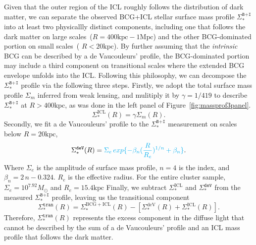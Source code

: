 \documentclass[fleqn,usenatbib]{mnras}
\newcommand{\sigbi}{\Sigma_*^{\texttt{B+I}}}
\newcommand{\sigm}{\Sigma_m}
\newcommand{\sigdev}{\Sigma_*^{\texttt{deV}}}
\newcommand{\sigtr}{\Sigma_*^{\texttt{tran}}}
\newcommand{\mpc}{\mathrm{Mpc}}
\newcommand{\kpc}{\mathrm{kpc}}
\newcommand{\msol}{M_{\odot}}
\newcommand\xkchen[1]{{\color{cyan} {#1}}}
\begin{document}
Given that the outer region of the ICL roughly follows the distribution of
dark matter, we can separate the observed BCG+ICL stellar surface mass
profile $\sigbi$ into at least two physicallly distinct components,
including one that follows the dark matter on large
scales~($R{=}400\kpc{-}1\mpc$) and the other BCG-dominated portion on small
scales~(\xkchen{$R{<}20\kpc$}). By further assuming that the {\it intrinsic} BCG
can be described by a de Vaucouleurs' profile, the BCG-dominated portion
may include a third component on transitional scales where the extended BCG
envelope unfolds into the ICL. Following this philosophy, we can decompose
the $\sigbi$ profile via the following three steps. Firstly, we adopt the
total surface mass profile $\sigm$ inferred from weak lensing, and
mulitiply it by \xkchen{$\gamma=1/419$} to
describe $\sigbi$ at $R>400\kpc$, as was done in the left panel of
Figure~\ref{fig:massprof3panel}.
\begin{equation}
    \Sigma_*^{\mathrm{ICL}}(R) = \gamma \sigm(R).
    \label{eqn:sigmaicl}
\end{equation}
Secondly, we fit a de Vaucouleurs' profile to the $\sigbi$ measurement on
scales below \xkchen{$R{=}20\kpc$},
\begin{equation}
    \sigdev(R) = \xkchen{ \Sigma_{e} \, exp \{ -\beta_{n} (\frac{R}{R_{e}})^{1/n} + \beta_{n} \} }.
    \label{eqn:sigmabcg}
\end{equation}
\xkchen{Where $\Sigma_{e}$ is the amplitude of surface mass profile, $n{=}4$ is the index, and $\beta_{n}{=}2\,n-0.324$. $R_{e}$ is the effective radius. For the entire cluster sample, $\Sigma_{e}{=}10^{7.92}\msol$ and $R_{e}{=}15.4\kpc$}
Finally, we subtract $\Sigma_*^{\mathrm{ICL}}$ and $\sigdev$ from the
measured $\sigbi$ profile, leaving us the transitional component
\begin{equation}
    \sigtr(R) = \Sigma_*^{\mathrm{BCG+ICL}}(R) -
    \left[\Sigma_*^{\mathrm{deV}}(R) + \Sigma_*^{\mathrm{ICL}}(R)\right].
    \label{eqn:sigmatran}
\end{equation}
Therefore, $\sigtr(R)$ represents the excess component in the diffuse light
that cannot be described by the sum of a de Vaucouleurs' profile and an ICL
mass profile that follows the dark matter.
\end{document}

